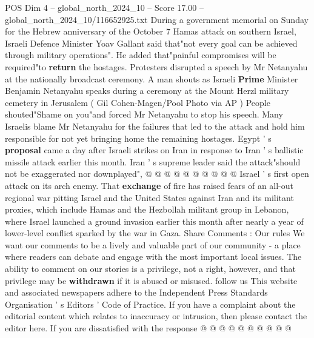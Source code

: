 \begin{textsample}{POS Dim 4 – global\_north\_2024\_10 – Score 17.00 – global\_north\_2024\_10/116652925.txt}
During a government memorial on Sunday for the Hebrew anniversary of the October 7 Hamas attack on southern Israel, Israeli Defence Minister Yoav Gallant said that"not every goal can be achieved through military operations".
He added that"painful compromises will be required"to \textbf{return} the hostages.
Protesters disrupted a speech by Mr Netanyahu at the nationally broadcast ceremony.
A man shouts as Israeli \textbf{Prime} Minister Benjamin Netanyahu speaks during a ceremony at the Mount Herzl military cemetery in Jerusalem ( Gil Cohen-Magen/Pool Photo via AP ) People shouted"Shame on you"and forced Mr Netanyahu to stop his speech.
Many Israelis blame Mr Netanyahu for the failures that led to the attack and hold him responsible for not yet bringing home the remaining hostages.
Egypt ' s \textbf{proposal} came a day after Israeli strikes on Iran in response to Iran ' s ballistic missile attack earlier this month.
Iran ' s supreme leader said the attack"should not be exaggerated nor downplayed", @ @ @ @ @ @ @ @ @ @ Israel ' s first open attack on its arch enemy.
That \textbf{exchange} of fire has raised fears of an all-out regional war pitting Israel and the United States against Iran and its militant proxies, which include Hamas and the Hezbollah militant group in Lebanon, where Israel launched a ground invasion earlier this month after nearly a year of lower-level conflict sparked by the war in Gaza.
Share Comments : Our rules We want our comments to be a lively and valuable part of our community - a place where readers can debate and engage with the most important local issues.
The ability to comment on our stories is a privilege, not a right, however, and that privilege may be \textbf{withdrawn} if it is abused or misused. follow us This website and associated newspapers adhere to the Independent Press Standards Organisation ' s Editors ' Code of Practice.
If you have a complaint about the editorial content which relates to inaccuracy or intrusion, then please contact the editor here.
If you are dissatisfied with the response @ @ @ @ @ @ @ @ @ @

\end{textsample}
